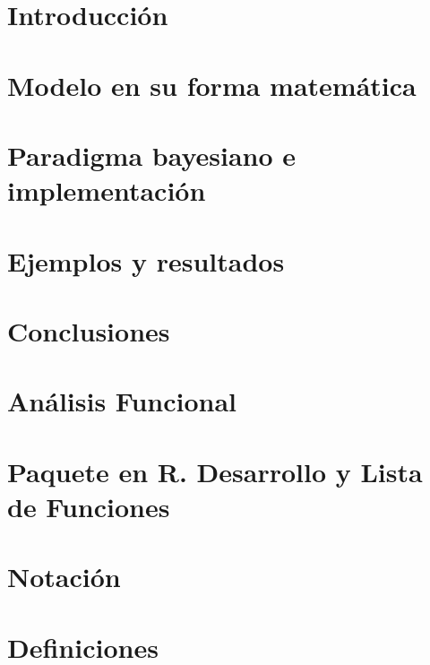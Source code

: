 \documentclass[pdftex,11pt]{report}
\begin{document}
 
%

\pagebreak
\tableofcontents


\chapter{Introducción} \label{cap:Intro}


\chapter{Modelo en su forma matemática} \label{cap:Modelo}


\chapter{Paradigma bayesiano e implementación} \label{cap:BayesAlgoritmo}


\chapter{Ejemplos y resultados} \label{cap:EjYRes}


\chapter{Conclusiones} \label{c	ap:Conclusiones}



\appendix
\chapter{Análisis Funcional} \label{ap:AnalisisFunc}


\chapter{Paquete en R. Desarrollo y Lista de Funciones} \label{ap:Paquete}


\chapter{Notación} \label{ap:Notacion}


\chapter{Definiciones} \label{ap:Definiciones}


\printbibliography
\end{document}
